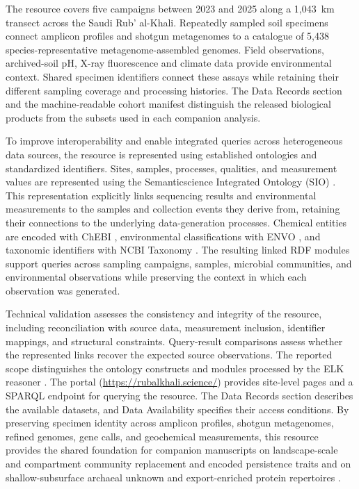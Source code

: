 \begin{revision}
The resource covers five campaigns between 2023 and 2025 along a 1,043~km transect across the Saudi Rub' al-Khali. Repeatedly sampled soil specimens connect amplicon profiles and shotgun metagenomes to a catalogue of 5,438 species-representative metagenome-assembled genomes. Field observations, archived-soil pH, X-ray fluorescence and climate data provide environmental context. Shared specimen identifiers connect these assays while retaining their different sampling coverage and processing histories. The Data Records section and the machine-readable cohort manifest distinguish the released biological products from the subsets used in each companion analysis.

To improve interoperability and enable integrated queries across heterogeneous data sources, the resource is represented using established ontologies and standardized identifiers. Sites, samples, processes, qualities, and measurement values are represented using the Semanticscience Integrated Ontology (SIO) \cite{sio}. This representation explicitly links sequencing results and environmental measurements to the samples and collection events they derive from, retaining their connections to the underlying data-generation processes. Chemical entities are encoded with ChEBI \cite{chebi}, environmental classifications with ENVO \cite{envo}, and taxonomic identifiers with NCBI Taxonomy \cite{ncbitaxon}. The resulting linked RDF modules support queries across sampling campaigns, samples, microbial communities, and environmental observations while preserving the context in which each observation was generated.

Technical validation assesses the consistency and integrity of the resource, including reconciliation with source data, measurement inclusion, identifier mappings, and structural constraints. Query-result comparisons assess whether the represented links recover the expected source observations. The reported scope distinguishes the ontology constructs and modules processed by the ELK reasoner \cite{elk}. The portal (\url{https://rubalkhali.science/}) provides site-level pages and a SPARQL endpoint for querying the resource. The Data Records section describes the available datasets, and Data Availability specifies their access conditions. By preserving specimen identity across amplicon profiles, shotgun metagenomes, refined genomes, gene calls, and geochemical measurements, this resource provides the shared foundation for companion manuscripts on landscape-scale and compartment community replacement and encoded persistence traits \cite{ecology_companion} and on shallow-subsurface archaeal unknown and export-enriched protein repertoires \cite{proteome_companion}.

\end{revision}
